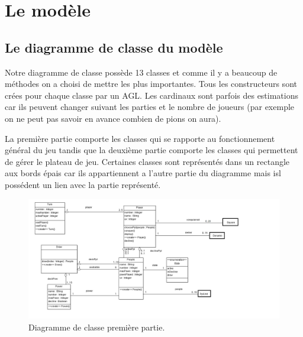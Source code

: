 \documentclass[11pt]{report}
\begin{document}
	

\chapter{Le modèle}

	\section{Le diagramme de classe du modèle}
	
	Notre diagramme de classe possède 13 classes et comme il y a beaucoup de méthodes on a choisi de mettre les plus importantes. Tous les constructeurs sont crées pour chaque classe par un AGL. Les cardinaux sont parfois des estimations car ils peuvent changer suivant les parties et le nombre de joueurs (par exemple on ne peut pas savoir en avance combien de pions on aura). 
	
	La première partie comporte les classes qui se rapporte au fonctionnement général du jeu tandis que la deuxième partie comporte les classes qui permettent de gérer le plateau de jeu.
Certaines classes sont représentés dans un rectangle aux bords épais car ils appartiennent a l'autre partie du diagramme mais isl possédent un lien avec la partie représenté.

					\begin{figure}[!h]
\centering
\includegraphics[width=13cm]{Game.png}
\caption{Diagramme de classe première partie.}
\end{figure}
\end{document}
